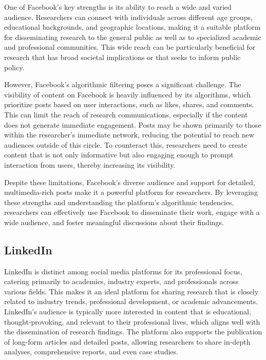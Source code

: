 \documentclass[
]{book}
\begin{document}
One of Facebook's key strengths is its ability to reach a wide and varied audience. Researchers can connect with individuals across different age groups, educational backgrounds, and geographic locations, making it a suitable platform for disseminating research to the general public as well as to specialized academic and professional communities. This wide reach can be particularly beneficial for research that has broad societal implications or that seeks to inform public policy.

However, Facebook's algorithmic filtering poses a significant challenge. The visibility of content on Facebook is heavily influenced by its algorithms, which prioritize posts based on user interactions, such as likes, shares, and comments. This can limit the reach of research communications, especially if the content does not generate immediate engagement. Posts may be shown primarily to those within the researcher's immediate network, reducing the potential to reach new audiences outside of this circle. To counteract this, researchers need to create content that is not only informative but also engaging enough to prompt interaction from users, thereby increasing its visibility.

Despite these limitations, Facebook's diverse audience and support for detailed, multimedia-rich posts make it a powerful platform for researchers. By leveraging these strengths and understanding the platform's algorithmic tendencies, researchers can effectively use Facebook to disseminate their work, engage with a wide audience, and foster meaningful discussions about their findings.

\subsection*{LinkedIn}\label{linkedin}

LinkedIn is distinct among social media platforms for its professional focus, catering primarily to academics, industry experts, and professionals across various fields. This makes it an ideal platform for sharing research that is closely related to industry trends, professional development, or academic advancements. LinkedIn's audience is typically more interested in content that is educational, thought-provoking, and relevant to their professional lives, which aligns well with the dissemination of research findings. The platform also supports the publication of long-form articles and detailed posts, allowing researchers to share in-depth analyses, comprehensive reports, and even case studies.
\end{document}
